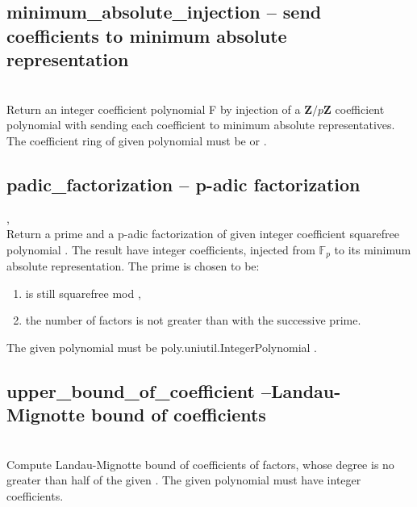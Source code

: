   \subsection{minimum\_absolute\_injection -- send coefficients to minimum absolute representation }
        {}
        {}\\
   \spacing
   \quad Return an integer coefficient polynomial F by injection of a $\mathbf{Z}/p\mathbf{Z}$ coefficient polynomial  with sending each coefficient to minimum absolute representatives.
   \spacing
   \quad The coefficient ring of given polynomial  must be  or .\\
%
  \subsection{padic\_factorization -- p-adic factorization}
        {}
        {, }\\
   \spacing
   \quad Return a prime  and a p-adic factorization of given integer coefficient squarefree polynomial . The result  have integer coefficients, injected from $\mathbb{F}_p$ to its minimum absolute representation.
   \spacing
   \quad \negok The prime is chosen to be:
   \begin{enumerate}
   \item {} is still squarefree mod ,
   \item the number of factors is not greater than with the successive prime.
   \end{enumerate}
   \quad The given polynomial  must be poly.uniutil.IntegerPolynomial .\\
%
  \subsection{upper\_bound\_of\_coefficient --Landau-Mignotte bound of coefficients}
        {}
        {}\\
   \spacing
   \quad Compute Landau-Mignotte bound of coefficients of factors, whose degree is no greater than half of the given .
   \spacing
   \quad The given polynomial  must have integer coefficients.\\
%
